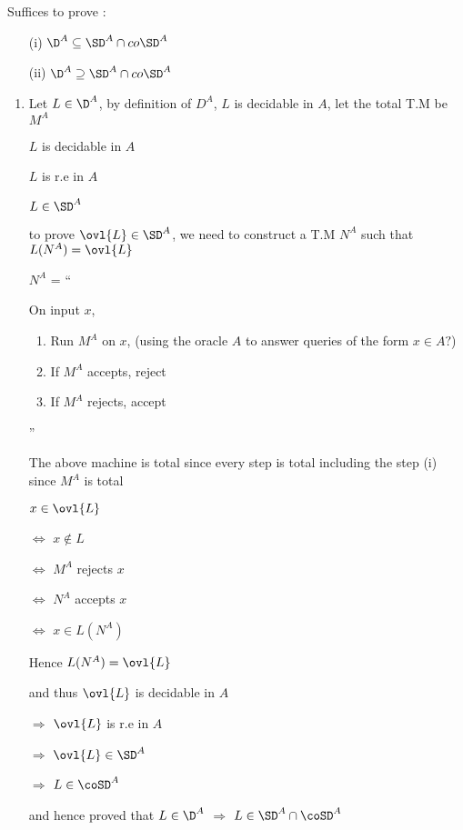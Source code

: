 
Suffices to prove :
\begin{enumerate}
    \item[(i)] $\D^A \subseteq \SD^A \cap co\SD^A$
    \item[(ii)] $\D^A \supseteq \SD^A \cap co\SD^A$
\end{enumerate}

\begin{enumerate}
    \item
    Let $L \in \D^A$,
    by definition of $D^A$, $L$ is decidable in $A$, let the total T.M be $M^A$
    
    $L$ is decidable in $A$
    
    \imp
    $L$ is r.e in $A$
    
    \imp
    $L \in \SD^A$
    
    to prove $\ovl{L} \in \SD^A$, we need to construct a T.M $N^A$ such that $L(N^A) = \ovl{L}$
    
    
    $N^A$ = ``
    
    On input $x$,
    \begin{enumerate}
        \item Run $M^A$ on $x$, (using the oracle $A$ to answer queries of the form $x \in A ?$)
        \item If $M^A$ accepts, reject
        \item If $M^A$ rejects, accept
    \end{enumerate}
    
    ''
    
    The above machine is total since every step is total including the step (i) since $M^A$ is total
    
    $x \in \ovl{L}$
    
    $\Leftrightarrow$
    $x \notin L$
    
    $\Leftrightarrow$
    $M^A$ rejects $x$
    
    $\Leftrightarrow$
    $N^A$ accepts $x$
    
    $\Leftrightarrow$
    $x \in L(N^A)$
    
    Hence $L(N^A) = \ovl{L}$
    
    and thus $\ovl{L}$ is decidable in $A$
    
    $\Rightarrow$
    $\ovl{L}$ is r.e in $A$
    
    $\Rightarrow$
    $\ovl{L} \in \SD^A$
    
    $\Rightarrow$
    $L \in \coSD^A$
    
    and hence proved that $L \in \D^A$ $\Rightarrow$ $L \in \SD^A \cap \coSD^A$
    

\end{enumerate}
